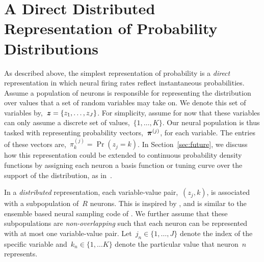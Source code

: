 
\section{A Direct Distributed Representation of Probability Distributions}
\label{sec:representation}


\sloppy
As described above, the simplest representation of probability is a \emph{direct}
representation in which neural firing rates reflect instantaneous
probabilities. Assume a population of neurons is responsible for
representing the distribution over values that a set of random
variables may take on. We denote this set of variables 
by,~${\boldsymbol{z} = \{z_1, \ldots, z_J\}}$.  For
simplicity, assume for now that these variables can only assume a
discrete set of values,~${\{1, \ldots, K\}}$.  Our
neural population is thus tasked with representing probability
vectors,~$\boldsymbol{\pi}^{(j)}$, for each 
variable. The entries of these vectors are,~${\pi^{(j)}_k = \Pr(z_j=k)}$.
In Section~\ref{sec:future}, we discuss how this representation could
be extended to continuous probability density functions by assigning
each neuron a basis function or tuning curve over the support of the
distribution, as in~\citet{Barber2003, Ma2006, beck2007exact}. 

In a \emph{distributed} representation, each variable-value
pair,~$(z_j,k)$, is associated with a subpopulation of~$R$
neurons. This is inspired by \citet{valiant1994circuits,
  valiant2005memorization}, and is similar to the ensemble based
neural sampling code of \citet{legenstein2014ensembles}.  We further
assume that these subpopulations are \emph{non-overlapping} such that
each neuron can be represented with at most one variable-value pair.
Let~${j_n \in \{1, \ldots, J\}}$ denote the index of the specific
variable and~$k_n \in \{1, \ldots K\}$ denote the particular
value that neuron~$n$ represents.


